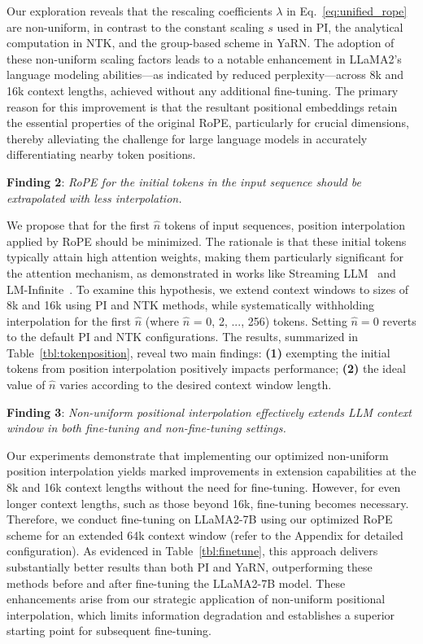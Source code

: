 Our exploration reveals that the rescaling coefficients $\lambda$ in Eq.~\ref{eq:unified_rope} are non-uniform, in contrast to the constant scaling $s$ used in PI, the analytical computation in NTK, and the group-based scheme in YaRN. The adoption of these non-uniform scaling factors leads to a notable enhancement in LLaMA2's language modeling abilities—as indicated by reduced perplexity—across 8k and 16k context lengths, achieved without any additional fine-tuning. The primary reason for this improvement is that the resultant positional embeddings retain the essential properties of the original RoPE, particularly for crucial dimensions, thereby alleviating the challenge for large language models in accurately differentiating nearby token positions.

\textbf{Finding 2}: \textit{RoPE for the initial tokens in the input sequence should be extrapolated with less interpolation.} 

We propose that for the first $\hat{n}$ tokens of input sequences, position interpolation applied by RoPE should be minimized. The rationale is that these initial tokens typically attain high attention weights, making them particularly significant for the attention mechanism, as demonstrated in works like Streaming LLM~\cite{streamingllm} and LM-Infinite~\cite{han2023lminfinite}. To examine this hypothesis, we extend context windows to sizes of 8k and 16k using PI and NTK methods, while systematically withholding interpolation for the first $\hat n$ (where $\hat n$ = 0, 2, ..., 256) tokens. Setting $\hat n = 0$ reverts to the default PI and NTK configurations. The results, summarized in Table~\ref{tbl:tokenposition}, reveal two main findings: \textbf{(1)} exempting the initial tokens from position interpolation positively impacts performance; \textbf{(2)} the ideal value of $\hat n$ varies according to the desired context window length.

\textbf{Finding 3}: \textit{Non-uniform positional interpolation effectively extends LLM context window in both fine-tuning and non-fine-tuning settings.} 

Our experiments demonstrate that implementing our optimized non-uniform position interpolation yields marked improvements in extension capabilities at the 8k and 16k context lengths without the need for fine-tuning. However, for even longer context lengths, such as those beyond 16k, fine-tuning becomes necessary. Therefore, we conduct fine-tuning on LLaMA2-7B using our optimized RoPE scheme for an extended 64k context window (refer to the Appendix for detailed configuration). As evidenced in Table~\ref{tbl:finetune}, this approach delivers substantially better results than both PI and YaRN, outperforming these methods before and after fine-tuning the LLaMA2-7B model. These enhancements arise from our strategic application of non-uniform positional interpolation, which limits information degradation and establishes a superior starting point for subsequent fine-tuning.

